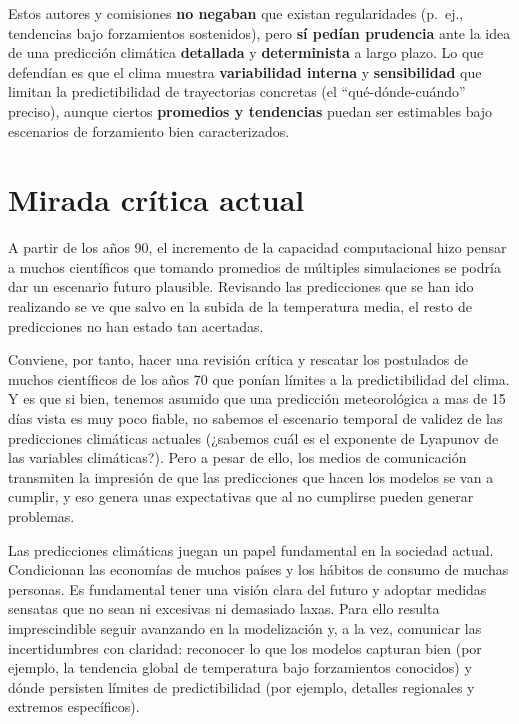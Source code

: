 \documentclass[
  10pt,
  a4paper,
  DIV=11,
  numbers=noendperiod,
  open=any]{scrreprt}
\numberwithin{equation}{chapter}
\numberwithin{equation}{section}
\renewcommand{\[}{\begin{equation}}
\renewcommand{\]}{\end{equation}}
\begin{document}
Estos autores y comisiones \textbf{no negaban} que existan regularidades
(p.~ej., tendencias bajo forzamientos sostenidos), pero \textbf{sí
pedían prudencia} ante la idea de una predicción climática
\textbf{detallada} y \textbf{determinista} a largo plazo. Lo que
defendían es que el clima muestra \textbf{variabilidad interna} y
\textbf{sensibilidad} que limitan la predictibilidad de trayectorias
concretas (el ``qué-dónde-cuándo'' preciso), aunque ciertos
\textbf{promedios y tendencias} puedan ser estimables bajo escenarios de
forzamiento bien caracterizados.

\section{Mirada crítica actual}\label{mirada-cruxedtica-actual}

A partir de los años 90, el incremento de la capacidad computacional
hizo pensar a muchos científicos que tomando promedios de múltiples
simulaciones se podría dar un escenario futuro plausible. Revisando las
predicciones que se han ido realizando se ve que salvo en la subida de
la temperatura media, el resto de predicciones no han estado tan
acertadas.

Conviene, por tanto, hacer una revisión crítica y rescatar los
postulados de muchos científicos de los años 70 que ponían límites a la
predictibilidad del clima. Y es que si bien, tenemos asumido que una
predicción meteorológica a mas de 15 días vista es muy poco fiable, no
sabemos el escenario temporal de validez de las predicciones climáticas
actuales (¿sabemos cuál es el exponente de Lyapunov de las variables
climáticas?). Pero a pesar de ello, los medios de comunicación
transmiten la impresión de que las predicciones que hacen los modelos se
van a cumplir, y eso genera unas expectativas que al no cumplirse pueden
generar problemas.

Las predicciones climáticas juegan un papel fundamental en la sociedad
actual. Condicionan las economías de muchos países y los hábitos de
consumo de muchas personas. Es fundamental tener una visión clara del
futuro y adoptar medidas sensatas que no sean ni excesivas ni demasiado
laxas. Para ello resulta imprescindible seguir avanzando en la
modelización y, a la vez, comunicar las incertidumbres con claridad:
reconocer lo que los modelos capturan bien (por ejemplo, la tendencia
global de temperatura bajo forzamientos conocidos) y dónde persisten
límites de predictibilidad (por ejemplo, detalles regionales y extremos
específicos).
\end{document}
